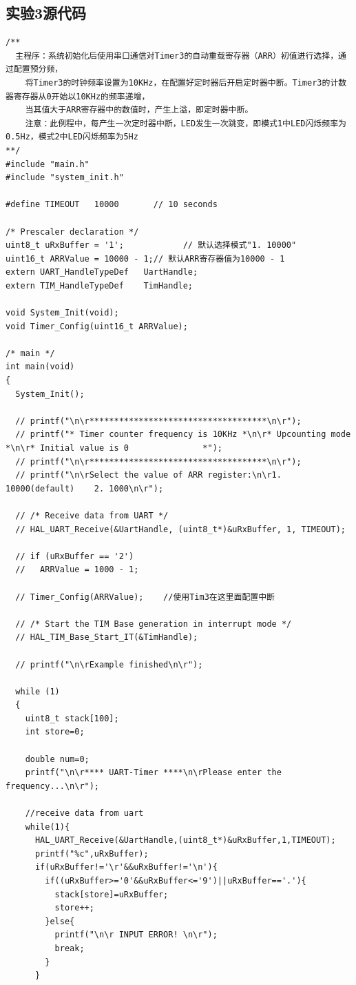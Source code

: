 ﻿\documentclass[UTF8,12pt]{article}
\begin{document}
\subsection{实验3源代码}
\begin{lstlisting}[frame=shadowbox]
/**
  主程序：系统初始化后使用串口通信对Timer3的自动重载寄存器（ARR）初值进行选择，通过配置预分频，
	将Timer3的时钟频率设置为10KHz，在配置好定时器后开启定时器中断。Timer3的计数器寄存器从0开始以10KHz的频率递增，
	当其值大于ARR寄存器中的数值时，产生上溢，即定时器中断。
	注意：此例程中，每产生一次定时器中断，LED发生一次跳变，即模式1中LED闪烁频率为0.5Hz，模式2中LED闪烁频率为5Hz
**/
#include "main.h"
#include "system_init.h"

#define TIMEOUT   10000       // 10 seconds

/* Prescaler declaration */
uint8_t uRxBuffer = '1';			// 默认选择模式"1. 10000"
uint16_t ARRValue = 10000 - 1;// 默认ARR寄存器值为10000 - 1
extern UART_HandleTypeDef   UartHandle;
extern TIM_HandleTypeDef    TimHandle;

void System_Init(void);
void Timer_Config(uint16_t ARRValue);
    
/* main */
int main(void)
{
  System_Init();
  
  // printf("\n\r************************************\n\r");
  // printf("* Timer counter frequency is 10KHz *\n\r* Upcounting mode                  *\n\r* Initial value is 0               *");
  // printf("\n\r************************************\n\r");
  // printf("\n\rSelect the value of ARR register:\n\r1. 10000(default)    2. 1000\n\r");
  
  // /* Receive data from UART */
  // HAL_UART_Receive(&UartHandle, (uint8_t*)&uRxBuffer, 1, TIMEOUT);
  
  // if (uRxBuffer == '2')
  //   ARRValue = 1000 - 1;

  // Timer_Config(ARRValue);	//使用Tim3在这里面配置中断

  // /* Start the TIM Base generation in interrupt mode */
  // HAL_TIM_Base_Start_IT(&TimHandle);
  
  // printf("\n\rExample finished\n\r");
  
  while (1)
  {
    uint8_t stack[100];
    int store=0;

    double num=0;
    printf("\n\r**** UART-Timer ****\n\rPlease enter the frequency...\n\r");

    //receive data from uart
    while(1){
      HAL_UART_Receive(&UartHandle,(uint8_t*)&uRxBuffer,1,TIMEOUT);
      printf("%c",uRxBuffer);
      if(uRxBuffer!='\r'&&uRxBuffer!='\n'){
        if((uRxBuffer>='0'&&uRxBuffer<='9')||uRxBuffer=='.'){
          stack[store]=uRxBuffer;
          store++;
        }else{
          printf("\n\r INPUT ERROR! \n\r");
          break;
        }
      }


\end{lstlisting}
\end{document}

